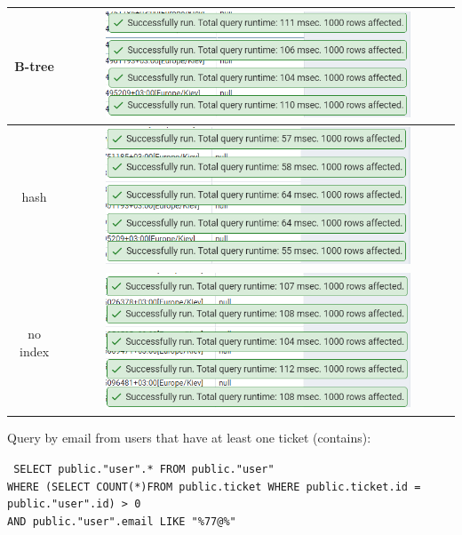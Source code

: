 \begin{center}
    \begin{tabular}{ | c | c |}
        \hline
        B-tree   & \includegraphics[width=0.8\textwidth]{images/query_select_user_by_email_like_performance_b_tree}   \\ \hline
        hash     & \includegraphics[width=0.8\textwidth]{images/query_select_user_by_email_like_performance_hash}     \\ \hline
        no index & \includegraphics[width=0.8\textwidth]{images/query_select_user_by_email_like_performance_no_index} \\ \hline
    \end{tabular}
\end{center}

\newpage
Query by email from users that have at least one ticket (contains):

\texttt{
    SELECT public."user".* FROM public."user" \\
    WHERE (SELECT COUNT(*)FROM public.ticket WHERE public.ticket.id = public."user".id) > 0 \\
    AND public."user".email LIKE "\%77@\%" \\
}

